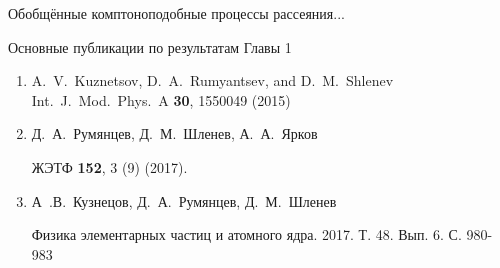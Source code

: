 \documentclass{beamer}
\begin{document}
\begin{frame}{Обобщённые комптоноподобные процессы рассеяния...}

\begin{center}
Основные публикации по результатам Главы 1
\end{center}
% 
\begin{enumerate}
%
\item
   A.~V.~Kuznetsov, D.~A.~Rumyantsev, and  D.~M.~Shlenev 
   Int.~J.~Mod.~Phys.~A {\bf 30}, 1550049 (2015)
% 
\item
   Д.~А.~Румянцев, Д.~М.~Шленев, А.~А.~Ярков

   ЖЭТФ {\bf 152}, 3 (9) (2017).
%
\item
  А~.В.~Кузнецов, Д.~А.~Румянцев, Д.~М.~Шленев

  Физика элементарных частиц и атомного ядра. 2017. 
  Т. 48. Вып. 6. С. 980-983
\end{enumerate}
\end{frame}


\end{document}
